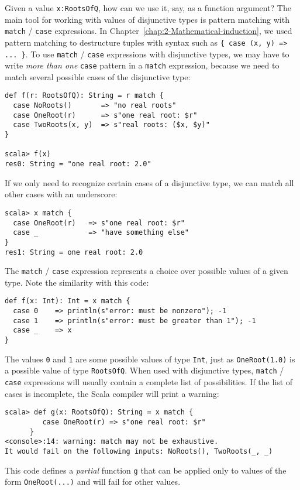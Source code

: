 Given a value \lstinline!x:RootsOfQ!, how can we use it, say, as
a function argument? The main tool for working with values of disjunctive
types is pattern matching with \lstinline!match! / \lstinline!case!
expressions. In Chapter~\ref{chap:2-Mathematical-induction}, we
used pattern matching to destructure tuples with syntax such as \lstinline!{ case (x, y) => ... }!.
To use \lstinline!match! / \lstinline!case! expressions with disjunctive
types, we may have to write \emph{more than one} \lstinline!case!
pattern in a \lstinline!match! expression, because we need to match
several possible cases of the disjunctive type:
\begin{lstlisting}
def f(r: RootsOfQ): String = r match {
  case NoRoots()       => "no real roots"
  case OneRoot(r)      => s"one real root: $r"
  case TwoRoots(x, y)  => s"real roots: ($x, $y)"
}

scala> f(x)
res0: String = "one real root: 2.0"
\end{lstlisting}
If we only need to recognize certain cases of a disjunctive type,
we can match all other cases with an underscore:
\begin{lstlisting}
scala> x match {
  case OneRoot(r)   => s"one real root: $r"
  case _            => "have something else"
}
res1: String = one real root: 2.0
\end{lstlisting}
The \lstinline!match! / \lstinline!case! expression represents a
choice over possible values of a given type. Note the similarity with
this code:

\begin{lstlisting}
def f(x: Int): Int = x match {
  case 0    => println(s"error: must be nonzero"); -1
  case 1    => println(s"error: must be greater than 1"); -1
  case _    => x
}
\end{lstlisting}
The values \lstinline!0! and \lstinline!1! are some possible values
of type \lstinline!Int!, just as \lstinline!OneRoot(1.0)! is a possible
value of type \lstinline!RootsOfQ!. When used with disjunctive types,
\lstinline!match! / \lstinline!case! expressions will usually contain
a complete list of possibilities. If the list of cases is incomplete,
the Scala compiler will print a warning:
\begin{lstlisting}
scala> def g(x: RootsOfQ): String = x match {
         case OneRoot(r) => s"one real root: $r"
      }
<console>:14: warning: match may not be exhaustive.
It would fail on the following inputs: NoRoots(), TwoRoots(_, _)
\end{lstlisting}
This code defines a \emph{partial} function
\lstinline!g! that can be applied only to values of the form \lstinline!OneRoot(...)!
and will fail for other values.

